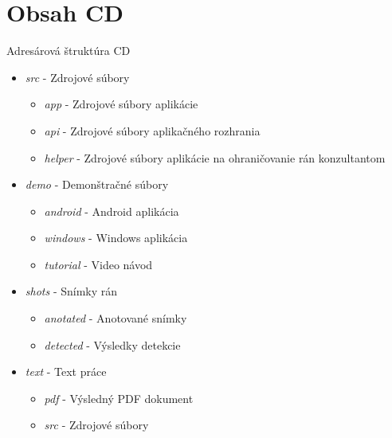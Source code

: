 \chapter{Obsah CD}
\label{pr:cd}
Adresárová štruktúra CD
\begin{itemize}
\item \textit{src} - Zdrojové súbory 
    \begin{itemize}
    \item \textit{app} - Zdrojové súbory aplikácie
    \item \textit{api} - Zdrojové súbory aplikačného rozhrania
    \item \textit{helper} - Zdrojové súbory aplikácie na ohraničovanie rán konzultantom
    \end{itemize}
\item \textit{demo} - Demonštračné súbory
    \begin{itemize}
    \item \textit{android} - Android aplikácia
    \item \textit{windows} - Windows aplikácia
    \item \textit{tutorial} - Video návod
    \end{itemize}
\item \textit{shots} - Snímky rán
    \begin{itemize}
    \item \textit{anotated} - Anotované snímky
    \item \textit{detected} - Výsledky detekcie
    \end{itemize}
\item \textit{text} - Text práce
    \begin{itemize}
    \item \textit{pdf} - Výsledný PDF dokument
    \item \textit{src} - Zdrojové súbory
    \end{itemize}
\end{itemize}

